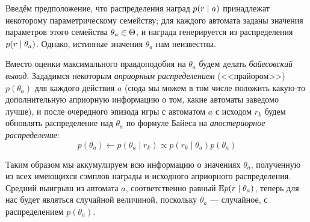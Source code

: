 Введём предположение, что распределения наград $p(r \HM\mid a)$ принадлежат некоторому параметрическому семейству; для каждого автомата заданы значения параметров этого семейства $\theta_a \HM\in \Theta$, и награда генерируется из распределения $p(r \HM\mid \theta_a)$. Однако, истинные значения $\theta_a$ нам неизвестны.

Вместо оценки максимального правдоподобия на $\theta_a$ будем делать \emph{байесовский вывод}. Зададимся некоторым \emph{априорным распределением} (<<прайором>>) $p(\theta_a)$ для каждого действия $a$ (сюда мы можем в том числе положить какую-то дополнительную априорную информацию о том, какие автоматы заведомо лучше), и после очередного эпизода игры с автоматом $a$ с исходом $r_k$ будем обновлять распределение над $\theta_a$ по формуле Байеса на \emph{апостериорное распределение}:
\begin{equation*}
p(\theta_a) \leftarrow p(\theta_a \mid r_k) \propto p(r_k \mid \theta_a)p(\theta_a)
\end{equation*}

Таким образом мы аккумулируем всю информацию о значениях $\theta_a$, полученную из всех имеющихся сэмплов награды и исходного априорного распределения. Средний выигрыш из автомата $a$, соответственно равный $\mathbb{E} p(r \mid \theta_a)$, теперь для нас будет являться случайной величиной, поскольку $\theta_a$ --- случайное, с распределением $p(\theta_a)$.

